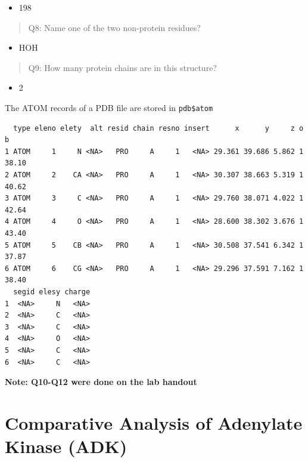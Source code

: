 \documentclass[
  letterpaper,
  DIV=11,
  numbers=noendperiod]{scrartcl}
\newenvironment{Shaded}{\begin{snugshade}}{\end{snugshade}}
\newcommand{\FunctionTok}[1]{\textcolor[rgb]{0.28,0.35,0.67}{#1}}
\newcommand{\NormalTok}[1]{\textcolor[rgb]{0.00,0.23,0.31}{#1}}
\newcommand{\SpecialCharTok}[1]{\textcolor[rgb]{0.37,0.37,0.37}{#1}}
\providecommand{\tightlist}{%
  \setlength{\itemsep}{0pt}\setlength{\parskip}{0pt}}\usepackage{longtable,booktabs,array}
\begin{document}
\begin{itemize}
\tightlist
\item
  198
\end{itemize}

\begin{quote}
Q8: Name one of the two non-protein residues?
\end{quote}

\begin{itemize}
\tightlist
\item
  HOH
\end{itemize}

\begin{quote}
Q9: How many protein chains are in this structure?
\end{quote}

\begin{itemize}
\tightlist
\item
  2
\end{itemize}

The ATOM records of a PDB file are stored in \texttt{pdb\$atom}

\begin{Shaded}
\end{Shaded}

\begin{verbatim}
  type eleno elety  alt resid chain resno insert      x      y     z o     b
1 ATOM     1     N <NA>   PRO     A     1   <NA> 29.361 39.686 5.862 1 38.10
2 ATOM     2    CA <NA>   PRO     A     1   <NA> 30.307 38.663 5.319 1 40.62
3 ATOM     3     C <NA>   PRO     A     1   <NA> 29.760 38.071 4.022 1 42.64
4 ATOM     4     O <NA>   PRO     A     1   <NA> 28.600 38.302 3.676 1 43.40
5 ATOM     5    CB <NA>   PRO     A     1   <NA> 30.508 37.541 6.342 1 37.87
6 ATOM     6    CG <NA>   PRO     A     1   <NA> 29.296 37.591 7.162 1 38.40
  segid elesy charge
1  <NA>     N   <NA>
2  <NA>     C   <NA>
3  <NA>     C   <NA>
4  <NA>     O   <NA>
5  <NA>     C   <NA>
6  <NA>     C   <NA>
\end{verbatim}

\textbf{Note: Q10-Q12 were done on the lab handout}

\hypertarget{comparative-analysis-of-adenylate-kinase-adk}{%
\section{Comparative Analysis of Adenylate Kinase
(ADK)}\label{comparative-analysis-of-adenylate-kinase-adk}}
\end{document}
